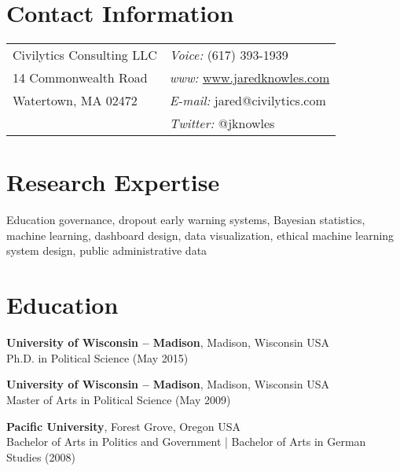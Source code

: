\documentclass[margin,line]{res}
\begin{document}

\begin{resume}
\section{\sc Contact Information}
\vspace{.05in}
\begin{tabular}{@{}p{2.75in}p{2.75in}}
Civilytics Consulting LLC & {\it Voice:}  (617) 393-1939 \\            
14 Commonwealth Road & {\it www:} \url{www.jaredknowles.com} \\           
Watertown, MA 02472 & {\it E-mail:}  jared@civilytics.com\\       
 & {\it Twitter:} @jknowles      \\   
\end{tabular}


\section{\sc Research Expertise}
Education governance, dropout early warning systems, Bayesian statistics, machine learning, 
dashboard design, data visualization, ethical machine learning system design, public administrative data

\section{\sc Education}
\vspace*{-0.15mm}
{\bf University of Wisconsin -- Madison}, Madison, Wisconsin USA \\
\vspace*{-0.15mm}
Ph.D. in Political Science (May 2015) 

{\bf University of Wisconsin -- Madison}, Madison, Wisconsin USA \\
\vspace*{-0.15mm}
Master of Arts in Political Science (May 2009)

{\bf Pacific University}, Forest Grove, Oregon USA \\
\vspace*{-0.15mm}
Bachelor of Arts in Politics and Government | Bachelor of Arts in German Studies (2008) \\


\end{resume}
\end{document}
